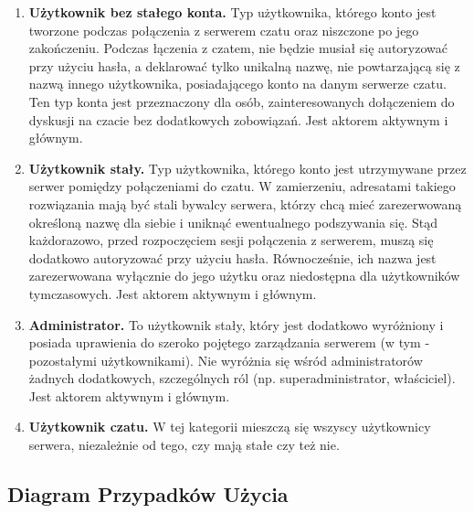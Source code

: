 \documentclass[11pt,oneside,a4paper,titlepage,onecolumn]{article}
\begin{document}
\begin{enumerate}
	\item \textbf{Użytkownik bez stałego konta.} Typ użytkownika, którego konto jest tworzone podczas połączenia z serwerem czatu oraz 
		niszczone po jego zakończeniu. Podczas łączenia z czatem, nie będzie musiał się autoryzować przy użyciu hasła, a deklarować
		tylko unikalną nazwę, nie powtarzającą się z nazwą innego użytkownika, posiadającego konto na danym serwerze czatu. Ten typ
		konta jest przeznaczony dla osób, zainteresowanych dołączeniem do dyskusji na czacie bez dodatkowych zobowiązań. Jest aktorem aktywnym
		i głównym.
		
	\item \textbf{Użytkownik stały.} Typ użytkownika, którego konto jest utrzymywane przez serwer pomiędzy połączeniami do czatu. W
		zamierzeniu, adresatami takiego rozwiązania mają być stali bywalcy serwera, którzy chcą mieć zarezerwowaną określoną nazwę
		dla siebie i uniknąć ewentualnego podszywania się. Stąd każdorazowo, przed rozpoczęciem sesji połączenia z serwerem, muszą się
		dodatkowo autoryzować przy użyciu hasła. Równocześnie, ich nazwa jest zarezerwowana wyłącznie do jego użytku oraz niedostępna
		dla użytkowników tymczasowych.  Jest aktorem aktywnym i głównym.
		
	\item \textbf{Administrator.} To użytkownik stały, który jest dodatkowo wyróżniony i posiada uprawienia do szeroko pojętego 
		zarządzania serwerem (w tym - pozostałymi użytkownikami). Nie wyróżnia się wśród administratorów żadnych dodatkowych, szczególnych
		ról (np. superadministrator, właściciel).  Jest aktorem aktywnym i głównym.
		
	\item \textbf{Użytkownik czatu.} W tej kategorii mieszczą się wszyscy
	użytkownicy serwera, niezależnie od tego, czy mają stałe czy też nie.

\end{enumerate}

\newpage
\subsection{Diagram Przypadków Użycia}
\end{document}
